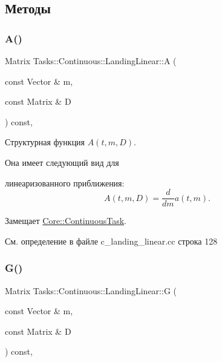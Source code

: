 \subsection{Методы}
\hypertarget{class_tasks_1_1_continuous_1_1_landing_linear_a8b06d0f38d73a27f7de0df6ba36b9c38}{}\label{class_tasks_1_1_continuous_1_1_landing_linear_a8b06d0f38d73a27f7de0df6ba36b9c38} 
\subsubsection{\texorpdfstring{A()}{A()}}
{\footnotesize\ttfamily Matrix Tasks\+::\+Continuous\+::\+Landing\+Linear\+::A (\begin{DoxyParamCaption}\item[{const Vector \&}]{m,  }\item[{const Matrix \&}]{D }\end{DoxyParamCaption}) const\hspace{0.3cm}{\ttfamily [override]}, {\ttfamily [virtual]}}



Структурная функция $A(t, m, D)$. 

Она имеет следующий вид для


\begin{DoxyItemize}
\item линеаризованного приближения\+: \[A(t, m, D) = \frac{d}{dm} a(t, m).\] 
\end{DoxyItemize}

Замещает \hyperlink{class_core_1_1_continuous_task_a75fbac1abe67223cd7938b724c5cce45}{Core\+::\+Continuous\+Task}.



См. определение в файле c\+\_\+landing\+\_\+linear.\+cc строка 128

\hypertarget{class_tasks_1_1_continuous_1_1_landing_linear_af5937be9d9010e853956e5dd7ff96e8d}{}\label{class_tasks_1_1_continuous_1_1_landing_linear_af5937be9d9010e853956e5dd7ff96e8d} 
\subsubsection{\texorpdfstring{G()}{G()}}
{\footnotesize\ttfamily Matrix Tasks\+::\+Continuous\+::\+Landing\+Linear\+::G (\begin{DoxyParamCaption}\item[{const Vector \&}]{m,  }\item[{const Matrix \&}]{D }\end{DoxyParamCaption}) const\hspace{0.3cm}{\ttfamily [override]}, {\ttfamily [virtual]}}



